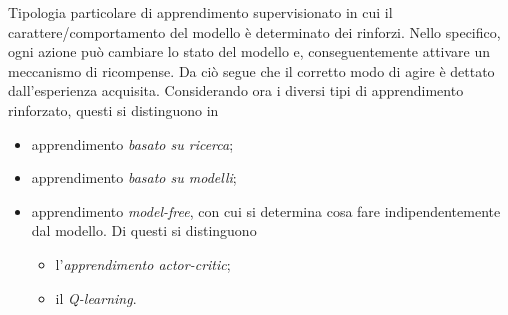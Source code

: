\documentclass{subfiles}
\begin{document}
Tipologia particolare di apprendimento supervisionato in cui il carattere/comportamento del modello è determinato dei rinforzi.
Nello specifico, ogni azione può cambiare lo stato del modello e, conseguentemente attivare un meccanismo di ricompense.
Da ciò segue che il corretto modo di agire è dettato dall'esperienza acquisita.
Considerando ora i diversi tipi di apprendimento rinforzato, questi si distinguono in
\begin{itemize}
    \item apprendimento \emph{basato su ricerca};
    \item apprendimento \emph{basato su modelli};
    \item apprendimento \emph{model-free}, con cui si determina cosa fare indipendentemente dal modello.
          Di questi si distinguono
          \begin{itemize}
              \item l'\emph{apprendimento actor-critic};
              \item il \emph{Q-learning}.
          \end{itemize}
\end{itemize}
\end{document}
